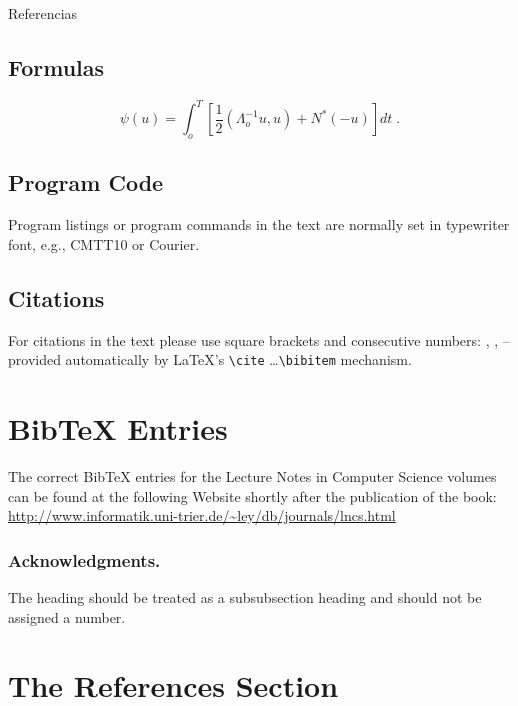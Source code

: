\documentclass[runningheads,a4paper]{llncs}
\begin{document}
Referencias



\subsection{Formulas}

\begin{equation}
  \psi (u) = \int_{o}^{T} \left[\frac{1}{2}
  \left(\Lambda_{o}^{-1} u,u\right) + N^{\ast} (-u)\right] dt \;  .
\end{equation}



\subsection{Program Code}

Program listings or program commands in the text are normally set in
typewriter font, e.g., CMTT10 or Courier.


\subsection{Citations}

For citations in the text please use
square brackets and consecutive numbers: \cite{jour}, \cite{lncschap},
\cite{proceeding1} -- provided automatically
by \LaTeX 's \verb|\cite| \dots\verb|\bibitem| mechanism.

\section{BibTeX Entries}

The correct BibTeX entries for the Lecture Notes in Computer Science
volumes can be found at the following Website shortly after the
publication of the book:
\url{http://www.informatik.uni-trier.de/~ley/db/journals/lncs.html}

\subsubsection*{Acknowledgments.} The heading should be treated as a
subsubsection heading and should not be assigned a number.

\section{The References Section}\label{references}
\end{document}
